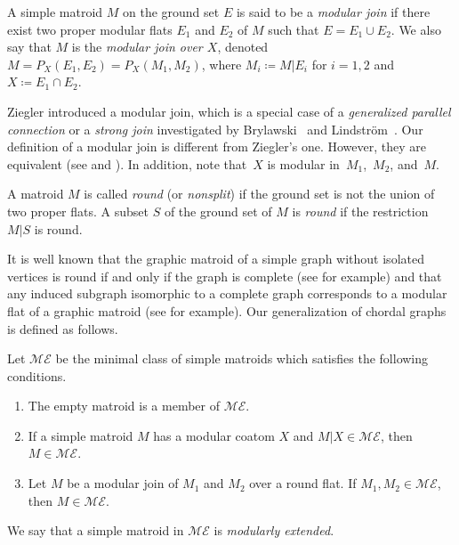 \documentclass[pdftex]{sigma}
\numberwithin{equation}{section}
\begin{document}
\begin{Definition}
A simple matroid $ M $ on the ground set $ E $ is said to be a \textit{modular join} if there exist two proper modular flats $ E_{1} $ and $ E_{2} $ of $ M $ such that $ E = E_{1} \cup E_{2} $.
We also say that $ M $ is the \textit{modular join over $ X $}, denoted $ M = P_{X}(E_{1}, E_{2}) = P_{X}(M_{1}, M_{2}) $, where $ M_{i} \coloneqq M|E_{i} $ for $ i = 1,2 $ and $ X \coloneqq E_{1} \cap E_{2} $.
\end{Definition}

\begin{Remark}
Ziegler \cite{ziegler1991binary-potams} introduced a modular join, which is a special case of a \textit{generalized parallel connection} or a \textit{strong join} investigated by Brylawski~\cite{brylawski1975modular-totams} and Lindstr{\"o}m~\cite{lindstrom1978strong-joctsa}.
Our definition of a modular join is different from Ziegler's one.
However, they are equivalent (see \cite[Propositioin~3.3]{ziegler1991binary-potams} and \cite[Proposition~5.10]{brylawski1975modular-totams}).
In addition, note that~$ X $ is modular in~$ M_{1}$,~$M_{2} $, and~$ M $.
\end{Remark}

\begin{Definition}A matroid $ M $ is called \textit{round} (or \textit{nonsplit}) if the ground set is not the union of two proper flats. A subset $ S $ of the ground set of $ M $ is \textit{round} if the restriction $ M|S $ is round.
\end{Definition}

It is well known that the graphic matroid of a simple graph without isolated vertices is round if and only if the graph is complete (see \cite[Theorem~4.2]{borissova2016regular-etpad} for example) and that any induced subgraph isomorphic to a complete graph corresponds to a modular flat of a graphic matroid (see \cite[Proposition~6.9.11 and below]{oxley2011matroid} for example).
Our generalization of chordal graphs is defined as follows.
\begin{Definition}\label{modularly extended matroid}
Let $ \mathcal{ME} $ be the minimal class of simple matroids which satisfies the following conditions.
\begin{enumerate}[$(i)$]\itemsep=0pt
\item The empty matroid is a member of $ \mathcal{ME} $.
\item If a simple matroid $ M $ has a modular coatom $ X $ and $ M|X \in \mathcal{ME} $, then $ M \in \mathcal{ME} $.
\item Let $ M $ be a modular join of $ M_{1} $ and $ M_{2} $ over a round flat.
If $ M_{1}, M_{2} \in \mathcal{ME} $, then $ M \in \mathcal{ME} $.
\end{enumerate}
We say that a simple matroid in $ \mathcal{ME} $ is \textit{modularly extended}.
\end{Definition}
\end{document}

